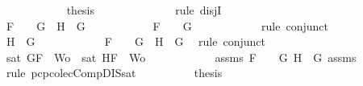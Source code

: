 \begin{isabellebody}
\ \ \ \ \ \ \ \ \ \ \isamarkupfalse%
\ {\isacharquery}thesis\isanewline
\ \ \ \ \ \ \ \ \ \ \ \ \isamarkupfalse%
\ {\isacharparenleft}rule\ disjI{}{\isacharparenright}\isanewline
\ \ \ \ \ \ \ \ \isamarkupfalse%
\isanewline
\ \ \ \ \ \ \isamarkupfalse%
\isanewline
\ \ \ \ \ \ \ \ \isamarkupfalse%
\ {\isachardoublequoteopen}F\ {\isacharequal}\ \isactrlbold {\isasymnot}\ {\isacharparenleft}\isactrlbold {\isasymnot}\ G{\isacharparenright}\ {\isasymand}\ H\ {\isacharequal}\ G{\isachardoublequoteclose}\isanewline
\ \ \ \ \ \ \ \ \isamarkupfalse%
\ \isamarkupfalse%
\ {\isachardoublequoteopen}F\ {\isacharequal}\ \isactrlbold {\isasymnot}\ {\isacharparenleft}\isactrlbold {\isasymnot}\ G{\isacharparenright}{\isachardoublequoteclose}\isanewline
\ \ \ \ \ \ \ \ \ \ \isamarkupfalse%
\ {\isacharparenleft}rule\ conjunct{}{\isacharparenright}\isanewline
\ \ \ \ \ \ \ \ \isamarkupfalse%
\ {\isachardoublequoteopen}H\ {\isacharequal}\ G{\isachardoublequoteclose}\isanewline
\ \ \ \ \ \ \ \ \ \ \isamarkupfalse%
\ {\isacartoucheopen}F\ {\isacharequal}\ \isactrlbold {\isasymnot}\ {\isacharparenleft}\isactrlbold {\isasymnot}\ G{\isacharparenright}\ {\isasymand}\ H\ {\isacharequal}\ G{\isacartoucheclose}\ \isamarkupfalse%
\ {\isacharparenleft}rule\ conjunct{}{\isacharparenright}\isanewline
\ \ \ \ \ \ \ \ \isamarkupfalse%
\ {\isachardoublequoteopen}sat\ {\isacharparenleft}{\isacharbraceleft}G{\isacharcomma}F{\isacharbraceright}\ {\isasymunion}\ Wo{\isacharparenright}\ {\isasymor}\ sat\ {\isacharparenleft}{\isacharbraceleft}H{\isacharcomma}F{\isacharbraceright}\ {\isasymunion}\ Wo{\isacharparenright}{\isachardoublequoteclose}\isanewline
\ \ \ \ \ \ \ \ \ \ \isamarkupfalse%
\ assms{\isacharparenleft}{}{\isacharparenright}\ {\isacartoucheopen}F\ {\isacharequal}\ \isactrlbold {\isasymnot}\ {\isacharparenleft}\isactrlbold {\isasymnot}\ G{\isacharparenright}{\isacartoucheclose}\ {\isacartoucheopen}H\ {\isacharequal}\ G{\isacartoucheclose}\ assms{\isacharparenleft}{}{\isacharcomma}{}{\isacharcomma}{}{\isacharparenright}\ \isamarkupfalse%
\ {\isacharparenleft}rule\ pcp{\isacharunderscore}colecComp{\isacharunderscore}DIS{\isacharunderscore}sat{}{\isacharparenright}\isanewline
\ \ \ \ \ \ \ \ \isamarkupfalse%
\ {\isacharquery}thesis\isanewline
\ \ \ \ \ \ \ \ \isamarkupfalse%

\end{isabellebody}
